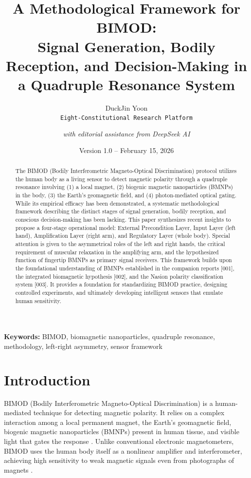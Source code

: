 \documentclass[12pt,a4paper]{article}
\title{A Methodological Framework for BIMOD: \\ Signal Generation, Bodily Reception, and Decision-Making in a Quadruple Resonance System}
\author{DuckJin Yoon\\ 
\texttt{Eight-Constitutional Research Platform} \\
\and 
\textit{with editorial assistance from DeepSeek AI}}
\date{Version 1.0 -- February 15, 2026}
\begin{document}
\maketitle

\begin{abstract}
The BIMOD (Bodily Interferometric Magneto-Optical Discrimination) protocol utilizes the human body as a living sensor to detect magnetic polarity through a quadruple resonance involving (1) a local magnet, (2) biogenic magnetic nanoparticles (BMNPs) in the body, (3) the Earth's geomagnetic field, and (4) photon-mediated optical gating. While its empirical efficacy has been demonstrated, a systematic methodological framework describing the distinct stages of signal generation, bodily reception, and conscious decision-making has been lacking. This paper synthesizes recent insights to propose a four-stage operational model: External Precondition Layer, Input Layer (left hand), Amplification Layer (right arm), and Regulatory Layer (whole body). Special attention is given to the asymmetrical roles of the left and right hands, the critical requirement of muscular relaxation in the amplifying arm, and the hypothesized function of fingertip BMNPs as primary signal receivers. This framework builds upon the foundational understanding of BMNPs established in the companion reports [001], the integrated biomagnetic hypothesis [002], and the Nasion polarity classification system [003]. It provides a foundation for standardizing BIMOD practice, designing controlled experiments, and ultimately developing intelligent sensors that emulate human sensitivity.
\end{abstract}

\noindent\textbf{Keywords:} BIMOD, biomagnetic nanoparticles, quadruple resonance, methodology, left-right asymmetry, sensor framework

\section{Introduction}

BIMOD (Bodily Interferometric Magneto-Optical Discrimination) is a human-mediated technique for detecting magnetic polarity. It relies on a complex interaction among a local permanent magnet, the Earth's geomagnetic field, biogenic magnetic nanoparticles (BMNPs) present in human tissue, and visible light that gates the response \citep{yoon2026bimod, xu2024biogenic}. Unlike conventional electronic magnetometers, BIMOD uses the human body itself as a nonlinear amplifier and interferometer, achieving high sensitivity to weak magnetic signals even from photographs of magnets \citep{hu2024optical}.
\end{document}
